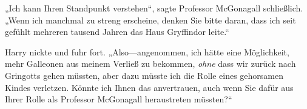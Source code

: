 






„Ich kann Ihren Standpunkt verstehen“, sagte Professor McGonagall schließlich. „Wenn ich manchmal zu streng erscheine, denken Sie bitte daran, dass ich seit gefühlt mehreren tausend Jahren das Haus Gryffindor leite.“

Harry nickte und fuhr fort. „Also—angenommen, ich hätte eine Möglichkeit, mehr Galleonen aus meinem Verließ zu bekommen, \emph{ohne} dass wir zurück nach Gringotts gehen müssten, aber dazu müsste ich die Rolle eines gehorsamen Kindes verletzen. Könnte ich Ihnen das anvertrauen, auch wenn Sie dafür aus Ihrer Rolle als Professor McGonagall heraustreten müssten?“

